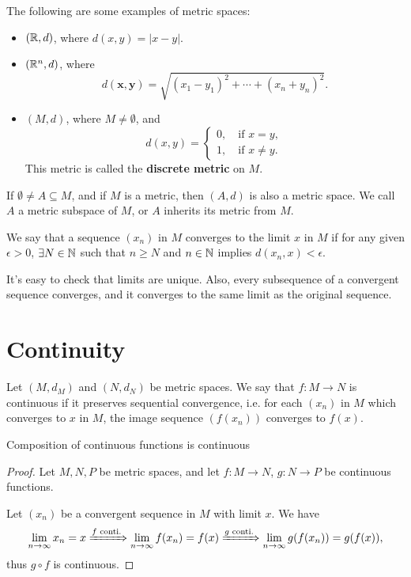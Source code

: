 \begin{ex}
    The following are some examples of metric spaces:
    \begin{itemize}
        \item $({\mathbb R}, d)$, where $d(x, y) = |x - y|$.
        \item $({\mathbb R}^n, d)$, where
        \[
        d(\mathbf x, \mathbf y) = \sqrt{(x_1 - y_1)^2 + \cdots + (x_n + y_n)^2}.
        \]
        \item $(M, d)$, where $M\neq\emptyset$, and
        \[
        d(x, y) = \begin{cases}
            0, \quad \text{if } x = y, \\
            1, \quad \text{if } x \neq y.
        \end{cases}
        \]
        This metric is called the \textbf{discrete metric} on $M$.
    \end{itemize}
\end{ex}

If $\emptyset \neq A \subseteq M$, and if $M$ is a metric, then $(A, d)$ is also a metric space. We call $A$ a metric subspace of $M$, or $A$ inherits its metric from $M$.

\begin{df}
    We say that a sequence $(x_n)$ in $M$ converges to the limit $x$ in $M$ if for any given $\epsilon > 0$, $\exists N \in {\mathbb N}$ such that $n\geq N$ and $n \in {\mathbb N}$ implies $d(x_n, x) < \epsilon$.
\end{df}

It's easy to check that limits are unique. Also, every subsequence of a convergent sequence converges, and it converges to the same limit as the original sequence.

\section{Continuity}

\begin{df}
    Let $(M, d_M)$ and $(N, d_N)$ be metric spaces. We say that $f: M\to N$ is continuous if it preserves sequential convergence, i.e. for each $(x_n)$ in $M$ which converges to $x$ in $M$, the image sequence $(f(x_n))$ converges to $f(x)$.
\end{df}

\begin{prop}
    Composition of continuous functions is continuous
    \begin{proof}
        Let $M, N, P$ be metric spaces, and let $f: M\to N$, $g: N\to P$ be continuous functions.
        
        Let $(x_n)$ be a convergent sequence in $M$ with limit $x$. We have
        \[
        \lim_{n\to\infty} x_n = x \xRightarrow{f\text{ conti.}} \lim_{n\to\infty} f(x_n) = f(x) \xRightarrow{g\text{ conti.}} \lim_{n\to\infty} g(f(x_n)) = g(f(x)),
        \]
        thus $g\circ f$ is continuous.
    \end{proof}
\end{prop}

